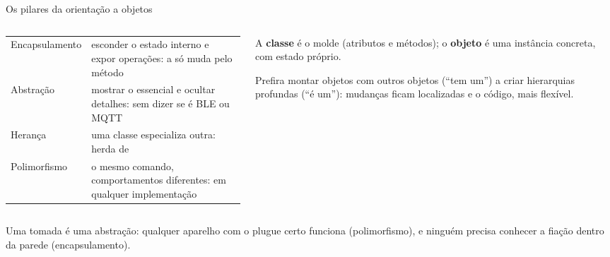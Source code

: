 \begin{frame}{Os pilares da orientação a objetos}
  \begin{columns}[T]
    \begin{column}{0.54\textwidth}
      \scriptsize
      \begin{tabularx}{\linewidth}{@{}l L@{}}
        \toprule
         &  \\
        \midrule
        Encapsulamento & esconder o estado interno e expor operações: a  só muda pelo método  \\
        Abstração & mostrar o essencial e ocultar detalhes:  sem dizer se é BLE ou MQTT \\
        Herança & uma classe especializa outra:  herda de  \\
        Polimorfismo & o mesmo comando, comportamentos diferentes:  em qualquer implementação \\
        \bottomrule
      \end{tabularx}
    \end{column}
    \begin{column}{0.44\textwidth}
      \begin{definicao}
        A \textbf{classe} é o molde (atributos e métodos); o \textbf{objeto} é uma instância concreta, com estado próprio.
      \end{definicao}
      \begin{dica}
        Prefira montar objetos com outros objetos (``tem um'') a criar hierarquias profundas (``é um''): mudanças ficam localizadas e o código, mais flexível.
      \end{dica}
    \end{column}
  \end{columns}
  \begin{analogia}
    Uma tomada é uma abstração: qualquer aparelho com o plugue certo funciona (polimorfismo), e ninguém precisa conhecer a fiação dentro da parede (encapsulamento).
  \end{analogia}
\end{frame}

